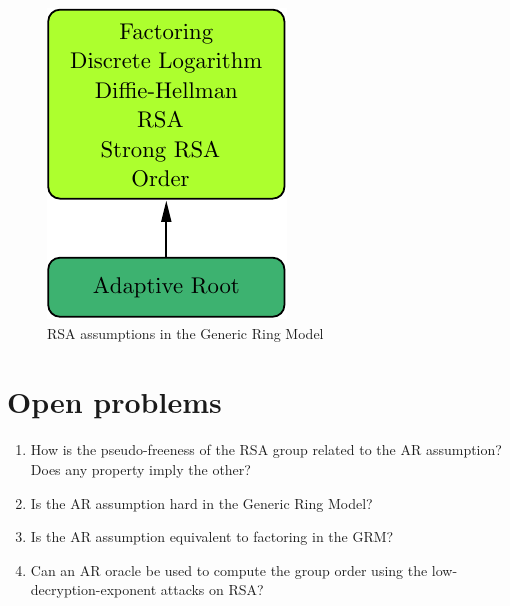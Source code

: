 \documentclass[a4paper]{article}
\begin{document}
\begin{figure}
    \centering
    \includegraphics[scale=0.8]{pics/GRA-assum.pdf}
    \caption{RSA assumptions  in the Generic Ring Model}
    \label{fig:gra}
\end{figure}
\section{Open problems}

\begin{enumerate}
    \item How is the pseudo-freeness of the RSA group related to the AR assumption? Does any property imply the other?
    \item Is the AR assumption hard in the Generic Ring Model?
    \item Is the AR assumption equivalent to factoring in the GRM? 
    \item Can an AR oracle be used to compute the group order using the low-decryption-exponent attacks on RSA?
\end{enumerate}



\end{document}
